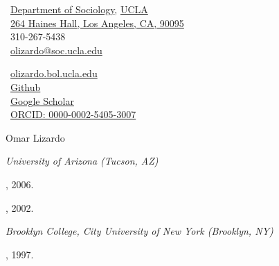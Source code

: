 \documentclass[10pt]{article}
\makeatletter
\def\myemail{olizardo@soc.ucla.edu}
\def\myweb{http://olizardo.bol.ucla.edu}
\def\myphone{310-267-5438}
\makeatother
\begin{document}
\begin{minipage}[t]{3.5in}
    \faUniversity \, \href{https://soc.ucla.edu}{Department of Sociology}, \href{https://ucla.edu}{UCLA} \\
    \faLocationArrow \, \href{https://goo.gl/maps/Ge1pAsh17ANWcdRB7}{264 Haines Hall, Los Angeles, CA, 90095} \\
    \faPhone \, \myphone  \\ 
    \faEnvelope \, \href{mailto:\myemail}{\myemail} \\   
\end{minipage}
\begin{minipage}[t]{5in}
\vspace{-3.8mm}
    \faGlobe \, \href{\myweb}{olizardo.bol.ucla.edu} \\
    \faGithub \, \href{https://github.com/olizardo}{Github} \\
    \aiGoogleScholar \, \href{https://scholar.google.com/citations?user=Lt5nMNkAAAAJ&hl=en}{Google Scholar} \\ 
    \aiOrcidSquare \, \href{https://orcid.org/0000-0002-5405-3007}{ORCID: 0000-0002-5405-3007} \\
\end{minipage}
\vspace{10mm}
\newcommand{\myname}{ \noindent}
\begin{center}
    {\myname  Omar Lizardo}
\end{center}

\reversemarginpar
\bigskip
\bigskip
\noindent\emph{University of Arizona (Tucson, AZ) \vspace{0.01in}}

, 2006. 

, 2002.

\medskip
\noindent\emph{Brooklyn College, City University of New York (Brooklyn, NY) \vspace{0.02in}}

, 1997.
\end{document}
